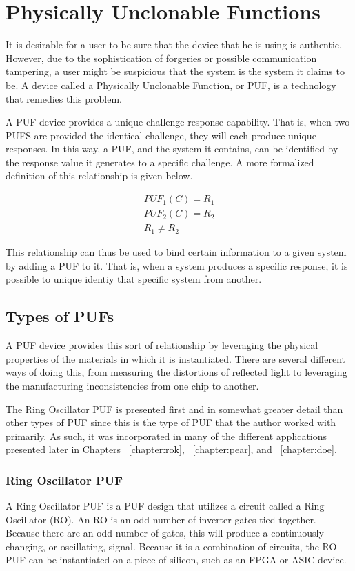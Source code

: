 
\chapter{Physically Unclonable Functions}
\label{chapter:pufoverview}
It is desirable for a user to be sure that the device that he is using is authentic. However, due to the sophistication
of forgeries or possible communication tampering, a user might be suspicious that the system is the system it claims
to be. A device called a Physically Unclonable Function, or PUF, is a technology that remedies this problem.

A PUF device provides a unique challenge-response capability. That is, when two PUFS are provided the identical
challenge, they will each produce unique responses. In this way, a PUF, and the system it contains, 
can be identified by the response value it generates to a specific challenge. A more formalized definition of
this relationship is given below.

\begin{align*}
PUF_1(C) = R_1\\
PUF_2(C) = R_2\\
R_1 \neq R_2
\end{align*}

This relationship can thus be used to bind certain information to a given system by adding a PUF
to it. That is, when a system produces a specific response, it is possible to unique identiy that 
specific system from another.

\section{Types of PUFs}
A PUF device provides this sort of relationship by leveraging the physical properties
of the materials in which it is instantiated. There are several different ways of doing
this, from measuring the distortions of reflected light to leveraging the
manufacturing inconsistencies from one chip to another.

The Ring Oscillator PUF is presented first and in somewhat greater detail than
other types of PUF since this is the type of PUF that the author worked with primarily.
As such, it was incorporated in many of the different applications presented later in
Chapters ~\ref{chapter:rok}, ~\ref{chapter:pear}, and ~\ref{chapter:doe}.

\subsection{Ring Oscillator PUF}
A Ring Oscillator PUF is a PUF design that utilizes a circuit called a Ring 
Oscillator (RO). An RO is an odd number of inverter gates tied together. Because
there are an odd number of gates, this will produce a continuously changing,
or oscillating, signal. Because it is a combination of circuits, the RO PUF can
be instantiated on a piece of silicon, such as an FPGA or ASIC device.

